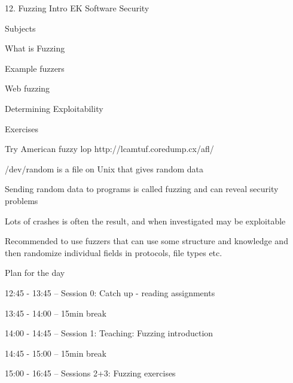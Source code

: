 \documentclass[Screen16to9,17pt]{foils}
\begin{document}
\mytitlepage
{12. Fuzzing Intro}
{EK  Software Security}


\begin{list1}
\item Subjects
\begin{list2}
\item What is Fuzzing
\item Example fuzzers
\item Web fuzzing
\item Determining Exploitability
\end{list2}
\item Exercises
\begin{list2}
\item Try American fuzzy lop http://lcamtuf.coredump.cx/afl/
\end{list2}
\end{list1}





\begin{list1}
\item /dev/random is a file on Unix that gives random data
\item Sending random data to programs is called fuzzing and can reveal security problems
\item Lots of crashes is often the result, and when investigated may be exploitable
\item Recommended to use fuzzers that can use some structure and knowledge and then randomize individual fields in protocols, file types etc.
\end{list1}



Plan for the day
\begin{list1}
\item 12:45 - 13:45 -- Session 0: Catch up - reading assignments
\item 13:45 - 14:00 -- 15min break
\item 14:00 - 14:45 -- Session 1: Teaching: Fuzzing introduction
\item 14:45 - 15:00 -- 15min break
\item 15:00 - 16:45 -- Sessions 2+3: Fuzzing exercises
\end{list1}
\end{document}

